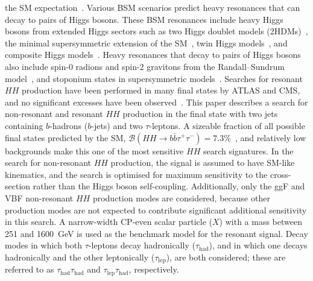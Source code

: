 \documentclass[twoside,11pt]{report}
\begin{document}
the SM expectation~\cite{CMS-PAS-HIG-20-005}.%
Various BSM scenarios predict heavy resonances that can decay to pairs of Higgs bosons. 
These BSM resonances include heavy Higgs bosons from extended Higgs sectors such as two Higgs doublet 
models (2HDMs)~\cite{Branco:2011iw}, the minimal supersymmetric extension of the 
SM~\cite{HABER198575,DIMOPOULOS1981150}, twin Higgs models~\cite{Chacko:2005vw}, 
and composite Higgs models~\cite{Grober:2010yv,Mrazek:2011iu}. Heavy resonances that decay 
to pairs of Higgs bosons also include spin-0 radions and spin-2 gravitons from the 
Randall--Sundrum model~\cite{Randall:1999ee,Tang:2012pv,Cheung:2000rw}, 
and stoponium states in supersymmetric models~\cite{Kumar:2014bca}. 
Searches for resonant $HH$ production have been performed in many final states by ATLAS and CMS, 
and no significant excesses have been 
observed~\cite{HIGG-2016-16-witherratum,CMS-HIG-17-002,HIGG-2016-15,CMS-HIG-17-008,ATLAS-CONF-2021-035,HIGG-2016-27,CMS-HIG-17-006,HIGG-2016-20,HIGG-2016-24,HDBS-2018-58,CMS-HIG-17-030}.%
This paper describes a search for non-resonant and resonant $HH$ production 
in the final state with two jets containing $b$-hadrons ($b$-jets) and two $\tau$-leptons. 
A sizeable fraction of all possible final states predicted by the SM, 
$\mathcal{B}(HH\to b\bar b\tau^+\tau^-)=7.3\%$~\cite{deFlorian:2016spz}, 
and relatively low backgrounds make this one of the most sensitive $HH$ search signatures. 
In the search for non-resonant $HH$ production, the signal is assumed to have SM-like kinematics, 
and the search is optimised for maximum sensitivity to the 
cross-section rather than the Higgs boson self-coupling. 
Additionally, only the ggF and VBF non-resonant $HH$ production modes are considered, 
because other production modes are not expected to contribute significant 
additional sensitivity in this search. 
A narrow-width CP-even scalar particle ($X$) with a mass between 251 and 
1600~GeV is used as the benchmark model for the resonant signal. 
Decay modes in which both $\tau$-leptons decay hadronically ($\tau_\text{had}$), 
and in which one decays hadronically and the other leptonically ($\tau_\text{lep}$), 
are both considered; these are referred to 
as $\tau_\text{had}\tau_\text{had}$ and $\tau_\text{lep}\tau_\text{had}$, respectively. 
\end{document}
